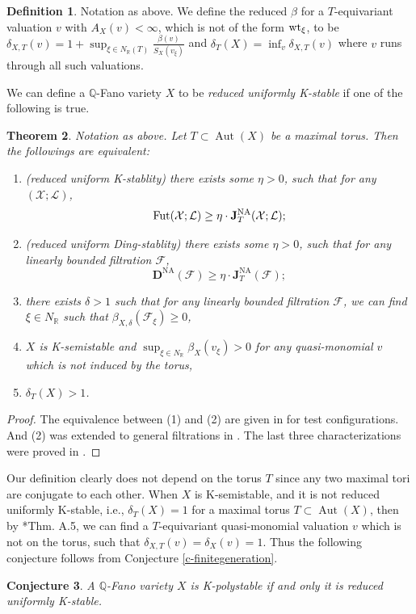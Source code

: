 \documentclass[12pt,reqno]{amsart}%
\newcommand{\Aut}[0]{\operatorname{Aut}}
\newcommand{\bR}{{\mathbb{R} }}
\newcommand{\cX}{{\mathcal{X}}}
\newcommand{\cL}{{\mathcal{L}}}
\newcommand{\cF}{\mathcal{F}}
\newcommand{\DNA}{\mathbf{D}^{\mathrm{NA}}}
\newcommand{\JNA}{\mathbf{J}^{\mathrm{NA}}}
\newtheorem{thm}{Theorem}[section]
\newtheorem{conj}[thm]{Conjecture}
\theoremstyle{definition}
\newtheorem{defn}[thm]{Definition}
\theoremstyle{remark}
\newcommand{\Fut}{{\rm Fut}}
\newcommand{\bQ}{{\mathbb{Q}}}
\newcommand{\wt}{{\rm wt}}
\begin{document}
\begin{defn}\label{d-reduceduniform}
Notation as above. 
We define the reduced $\beta$ for a $T$-equivariant valuation $v$ with $A_X(v)<\infty$,  which is not of the form $\wt_{\xi}$, to be 
$\delta_{X,T}(v)=1+\sup_{\xi\in N_{\bR}(T)} \frac{\beta(v)}{S_X(v_{\xi})}$ and $\delta_T(X)=\inf_v \delta_{X,T}(v)$ where $v$ runs through all such valuations. 
\end{defn}


We can define a $\bQ$-Fano variety $X$ to be {\it reduced uniformly K-stable} if one of the following is true. 

\begin{thm}\label{t-reducedK}
Notation as above. Let $T\subset \Aut(X)$ be a maximal torus. Then the followings are equivalent:
\begin{enumerate}
\item (reduced uniform K-stablity) there exists some $\eta>0$, such that for any $(\cX;\cL)$, 
$$\Fut(\cX;\cL)\ge \eta\cdot  \JNA_{T}(\cX;\cL);$$
\item (reduced uniform Ding-stablity) there exists some $\eta>0$, such that for any linearly bounded filtration $\cF$,  
$$\DNA(\cF)\ge \eta\cdot  \JNA_{T}(\cF);$$
\item there exists $\delta>1$ such that for any linearly bounded filtration $\cF$, we can find $\xi\in N_{\bR}$ such that $\beta_{X,\delta}(\cF_{\xi})\ge 0$, 
\item $X$ is K-semistable and $\sup_{\xi\in N_{\bR}}\beta_{X}(v_{\xi})> 0$ for any quasi-monomial $v$ which is not induced by the torus, %
\item $\delta_{T}(X)>1$. 
\end{enumerate}
\end{thm}
\begin{proof}The equivalence between (1) and (2) are given in \cite{Li19} for test configurations. And (2) was extended to general filtrations in \cite{XZ19}. The last three characterizations were proved in \cite[Thm. 1.4(3) and Thm. A.5]{XZ19}.
\end{proof}

Our definition clearly does not depend on the torus $T$ since any two maximal tori are conjugate to each other. When $X$ is K-semistable, and it is not reduced uniformly K-stable, i.e., $\delta_T(X)=1$ for a maximal torus $T\subset \Aut(X)$, then by \cite{XZ19}*{Thm. A.5}, we can find a $T$-equivariant quasi-monomial valuation $v$ which is not on the torus, such that  $\delta_{X,T}(v)=\delta_X(v)=1$. Thus the following conjecture follows from Conjecture \ref{c-finitegeneration}.
\begin{conj}\label{c-reducedk}
 A $\bQ$-Fano variety $X$ is K-polystable if and only it is  reduced uniformly K-stable.
 \end{conj}
\end{document}
